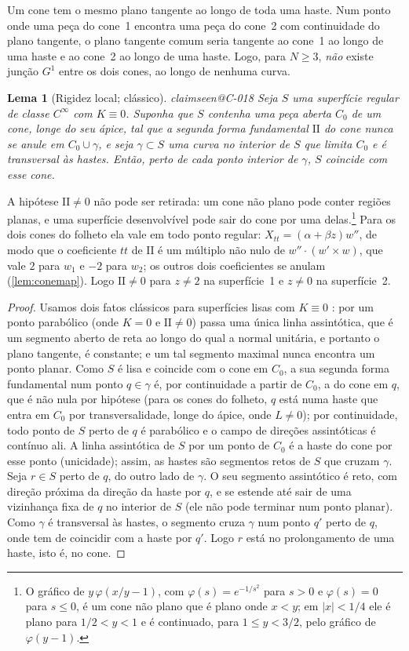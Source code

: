 \documentclass[11pt,a4paper]{article}
\makeatletter
\theoremstyle{plain}
\newtheorem{lemma}[theorem]{Lema}
\theoremstyle{remark}
\newcommand{\claim}[1]{\ifcsname claimseen@#1\endcsname\else\expandafter\gdef\csname claimseen@#1\endcsname{}\label{claim:#1}\fi}
\makeatother
\begin{document}
Um cone tem o mesmo plano tangente ao longo de toda uma haste. Num ponto onde uma peça do cone~1 encontra uma peça do cone~2
com continuidade do plano tangente, o plano tangente comum seria tangente ao cone~1 ao longo de uma haste e ao cone~2 ao longo
de uma haste. Logo, para $N\ge3$, \emph{não} existe junção $G^1$ entre os dois cones, ao longo de nenhuma curva.

\begin{lemma}[Rigidez local; clássico]\label{lem:rigid}\claim{C-018}
Seja $S$ uma superfície regular de classe $C^\infty$ com $K\equiv0$. Suponha que $S$ contenha uma peça aberta $C_0$ de um
cone, longe do seu ápice, tal que a segunda forma fundamental $\mathrm{II}$ do cone nunca se anule em $C_0\cup\gamma$, e seja
$\gamma\subset S$ uma curva no interior de $S$ que limita $C_0$ e é transversal às hastes. Então, perto de cada ponto interior
de $\gamma$, $S$ coincide com esse cone.
\end{lemma}
A hipótese $\mathrm{II}\ne0$ não pode ser retirada: um cone não plano pode conter regiões planas, e uma superfície desenvolvível
pode sair do cone por uma delas.\footnote{O gráfico de $y\,\varphi(x/y-1)$, com $\varphi(s)=e^{-1/s^2}$ para $s>0$ e
$\varphi(s)=0$ para $s\le0$, é um cone não plano que é plano onde $x<y$; em $|x|<1/4$ ele é plano para $1/2<y<1$ e é
continuado, para $1\le y<3/2$, pelo gráfico de $\varphi(y-1)$.} Para os dois cones do folheto ela vale em todo ponto regular:
$X_{tt}=(\alpha+\beta z)w''$, de modo que o coeficiente $tt$ de $\mathrm{II}$ é um múltiplo não nulo de $w''\cdot(w'\times w)$,
que vale $2$ para $w_1$ e $-2$ para $w_2$; os outros dois coeficientes se anulam (\cref{lem:conemap}). Logo $\mathrm{II}\ne0$
para $z\ne2$ na superfície~1 e $z\ne0$ na superfície~2.
\begin{proof}
Usamos dois fatos clássicos para superfícies lisas com $K\equiv0$ \citep[\S5-8, Proposições~1 e~2, devidas a
Massey]{doCarmo1976}: por um ponto parabólico (onde $K=0$ e $\mathrm{II}\ne0$) passa uma única linha assintótica, que é um
segmento aberto de reta ao longo do qual a normal unitária, e portanto o plano tangente, é constante; e um tal segmento
maximal nunca encontra um ponto planar. Como $S$ é lisa e coincide com o cone em $C_0$, a sua segunda forma fundamental num
ponto $q\in\gamma$ é, por continuidade a partir de $C_0$, a do cone em $q$, que é não nula por hipótese (para os cones do
folheto, $q$ está numa haste que entra em $C_0$ por transversalidade, longe do ápice, onde $L\ne0$); por continuidade, todo
ponto de $S$ perto de $q$ é parabólico e o campo de direções assintóticas é contínuo ali. A linha assintótica de $S$ por um
ponto de $C_0$ é a haste do cone por esse ponto (unicidade); assim, as hastes são segmentos retos de $S$ que cruzam $\gamma$.
Seja $r\in S$ perto de $q$, do outro lado de $\gamma$. O seu segmento assintótico é reto, com direção próxima da direção da
haste por $q$, e se estende até sair de uma vizinhança fixa de $q$ no interior de $S$ (ele não pode terminar num ponto
planar). Como $\gamma$ é transversal às hastes, o segmento cruza $\gamma$ num ponto $q'$ perto de $q$, onde tem de coincidir
com a haste por $q'$. Logo $r$ está no prolongamento de uma haste, isto é, no cone.
\end{proof}
\end{document}

